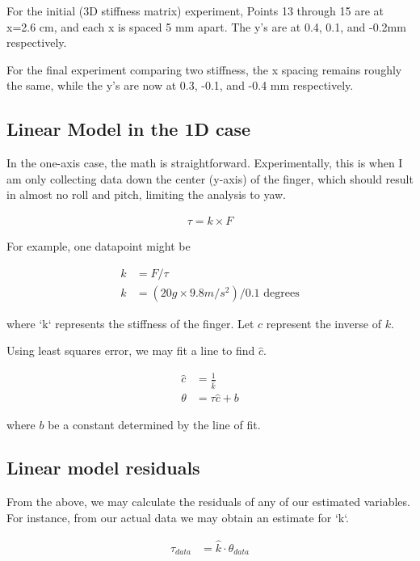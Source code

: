 \documentclass[preprint,12pt,3p]{elsarticle}
\begin{document}
For the initial (3D stiffness matrix) experiment, Points 13 through 15 are at x=2.6 cm, and each x is spaced 5 mm apart.
The y's are at 0.4, 0.1, and -0.2mm respectively.

For the final experiment comparing two stiffness, the x spacing remains roughly the same, while the
y's are now at 0.3, -0.1, and -0.4 mm respectively.
~\\

\subsection{Linear Model in the 1D case}

In the one-axis case, the math is straightforward. Experimentally, this is when I am only collecting
data down the center (y-axis) of the finger, which should result in almost no roll and pitch,
limiting the analysis to yaw. 

\begin{align}
\tau = k \times F
\end{align}

For example, one datapoint might be

\begin{align}
k &= F / \tau \\
k &= (20g \times 9.8 m/s^2)/0.1 \text{ degrees}
\end{align}

where `k` represents the stiffness of the finger. Let $c$ represent the inverse of $k$.

Using least squares error, we may fit a line to find $\hat{c}$. 

\begin{align}
 \hat{c} &= \frac{1}{\hat{k}} \\
 \theta &= \tau \hat{c} + b
\end{align}

where $b$ be a constant determined by the line of fit.



\subsection{Linear model residuals}

From the above, we may calculate the residuals of any of our estimated variables.
For instance, from our actual data we may obtain an estimate for `k`.

\begin{align}
 \tau_{data} &= \hat{k} \cdot \theta_{data} \\
\end{align}
\end{document}
